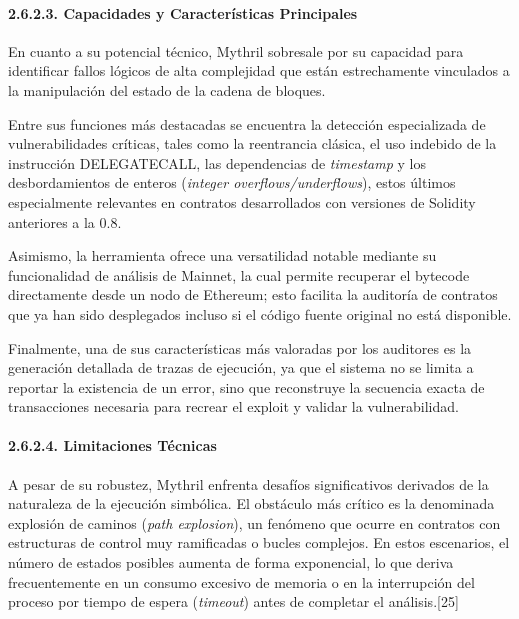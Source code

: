 \paragraph{2.6.2.3. Capacidades y Características
Principales}\label{capacidades-y-caracteruxedsticas-principales-1}

En cuanto a su potencial técnico, Mythril sobresale por su capacidad
para identificar fallos lógicos de alta complejidad que están
estrechamente vinculados a la manipulación del estado de la cadena de
bloques.

Entre sus funciones más destacadas se encuentra la detección
especializada de vulnerabilidades críticas, tales como la reentrancia
clásica, el uso indebido de la instrucción DELEGATECALL, las
dependencias de \emph{timestamp} y los desbordamientos de enteros
(\emph{integer overflows/underflows}), estos últimos especialmente
relevantes en contratos desarrollados con versiones de Solidity
anteriores a la 0.8.

Asimismo, la herramienta ofrece una versatilidad notable mediante su
funcionalidad de análisis de Mainnet, la cual permite recuperar el
bytecode directamente desde un nodo de Ethereum; esto facilita la
auditoría de contratos que ya han sido desplegados incluso si el código
fuente original no está disponible.

Finalmente, una de sus características más valoradas por los auditores
es la generación detallada de trazas de ejecución, ya que el sistema no
se limita a reportar la existencia de un error, sino que reconstruye la
secuencia exacta de transacciones necesaria para recrear el exploit y
validar la vulnerabilidad.

\paragraph{2.6.2.4. Limitaciones
Técnicas}\label{limitaciones-tuxe9cnicas}

A pesar de su robustez, Mythril enfrenta desafíos significativos
derivados de la naturaleza de la ejecución simbólica. El obstáculo más
crítico es la denominada explosión de caminos (\emph{path explosion}),
un fenómeno que ocurre en contratos con estructuras de control muy
ramificadas o bucles complejos. En estos escenarios, el número de
estados posibles aumenta de forma exponencial, lo que deriva
frecuentemente en un consumo excesivo de memoria o en la interrupción
del proceso por tiempo de espera (\emph{timeout}) antes de completar el
análisis.{[}25{]}

